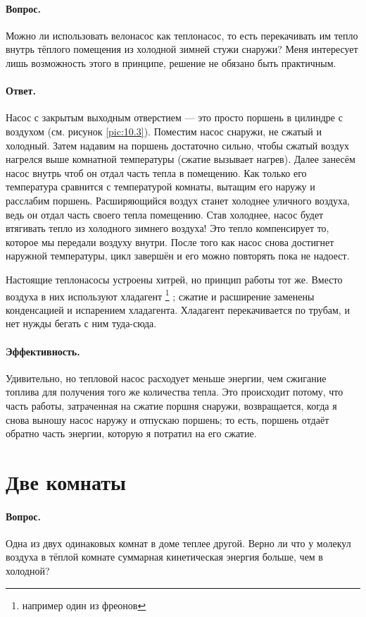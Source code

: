 \paragraph{Вопрос.}
Можно ли использовать велонасос как теплонасос, то есть перекачивать им тепло внутрь тёплого помещения из холодной зимней стужи снаружи?
Меня интересует лишь возможность этого в принципе, решение не обязано быть практичным.

\paragraph{Ответ.}
Насос с закрытым выходным отверстием — это просто поршень в цилиндре с воздухом (см. рисунок \ref{pic:10.3}).
Поместим насос снаружи, не сжатый и холодный.
Затем надавим на поршень достаточно сильно, чтобы сжатый воздух нагрелся выше комнатной температуры (сжатие вызывает нагрев).
Далее занесём насос внутрь чтоб он отдал часть тепла в помещению.
Как только его температура сравнится с температурой комнаты, вытащим его наружу и расслабим поршень.
Расширяющийся воздух станет холоднее уличного воздуха, ведь он отдал часть своего тепла помещению.
Став холоднее, насос будет втягивать тепло из холодного зимнего воздуха!
Это тепло компенсирует то, которое мы передали воздуху внутри.
После того как насос снова достигнет наружной температуры, цикл завершён и его можно повторять пока не надоест.

Настоящие теплонасосы устроены хитрей, но принцип работы тот же.
Вместо воздуха в них используют хладагент%
\footnote{например один из фреонов \pr}%
; сжатие и расширение заменены конденсацией и испарением хладагента.
Хладагент перекачивается по трубам, и нет нужды бегать с ним туда-сюда.

\paragraph{Эффективность.}
Удивительно, но тепловой насос расходует меньше энергии, чем сжигание топлива для получения того же количества тепла.
Это происходит потому, что часть работы, затраченная на сжатие поршня снаружи, возвращается, когда я снова выношу насос наружу и отпускаю поршень; то есть, поршень отдаёт обратно часть энергии, которую я потратил на его сжатие.

\section{Две комнаты}

\paragraph{Вопрос.}
Одна из двух одинаковых комнат в доме теплее другой.
Верно ли что у молекул воздуха в тёплой комнате
суммарная кинетическая энергия больше, чем в холодной?

